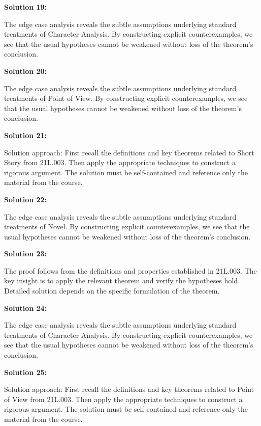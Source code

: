 \documentclass[12pt,a4paper]{exam}
\begin{document}
\vspace{0.5cm}

\textbf{Solution 19:}

The edge case analysis reveals the subtle assumptions underlying standard treatments of Character Analysis. By constructing explicit counterexamples, we see that the usual hypotheses cannot be weakened without loss of the theorem's conclusion.

\vspace{0.5cm}

\textbf{Solution 20:}

The edge case analysis reveals the subtle assumptions underlying standard treatments of Point of View. By constructing explicit counterexamples, we see that the usual hypotheses cannot be weakened without loss of the theorem's conclusion.

\vspace{0.5cm}

\textbf{Solution 21:}

Solution approach: First recall the definitions and key theorems related to Short Story from 21L.003. Then apply the appropriate techniques to construct a rigorous argument. The solution must be self-contained and reference only the material from the course.

\vspace{0.5cm}

\textbf{Solution 22:}

The edge case analysis reveals the subtle assumptions underlying standard treatments of Novel. By constructing explicit counterexamples, we see that the usual hypotheses cannot be weakened without loss of the theorem's conclusion.

\vspace{0.5cm}

\textbf{Solution 23:}

The proof follows from the definitions and properties established in 21L.003. The key insight is to apply the relevant theorem and verify the hypotheses hold. Detailed solution depends on the specific formulation of the theorem.

\vspace{0.5cm}

\textbf{Solution 24:}

The edge case analysis reveals the subtle assumptions underlying standard treatments of Character Analysis. By constructing explicit counterexamples, we see that the usual hypotheses cannot be weakened without loss of the theorem's conclusion.

\vspace{0.5cm}

\textbf{Solution 25:}

Solution approach: First recall the definitions and key theorems related to Point of View from 21L.003. Then apply the appropriate techniques to construct a rigorous argument. The solution must be self-contained and reference only the material from the course.

\vspace{0.5cm}
\end{document}
